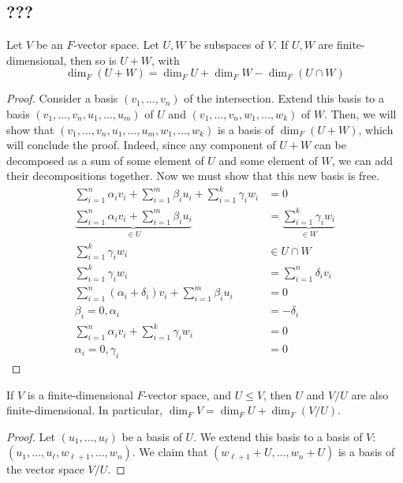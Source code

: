 \subsection{???}
\begin{proposition}
Let \( V \) be an \( F \)-vector space.
Let \( U, W \) be subspaces of \( V \).
If \( U, W \) are finite-dimensional, then so is \( U + W \), with
\[ \dim_F (U + W) = \dim_F U + \dim_F W - \dim_F (U \cap W) \]
\end{proposition}
\begin{proof}
Consider a basis \( (v_1, \dots, v_n) \) of the intersection.
Extend this basis to a basis \( (v_1, \dots, v_n, u_1, \dots, u_m) \) of \( U \) and \( (v_1, \dots, v_n, w_1, \dots, w_k) \) of \( W \).
Then, we will show that \( (v_1, \dots, v_n, u_1, \dots, u_m, w_1, \dots, w_k) \) is a basis of \( \dim_F (U + W) \), which will conclude the proof.
Indeed, since any component of \( U + W \) can be decomposed as a sum of some element of \( U \) and some element of \( W \), we can add their decompositions together.
Now we must show that this new basis is free.
\begin{align*}
    \sum_{i=1}^n \alpha_i v_i + \sum_{i=1}^m \beta_i u_i + \sum_{i=1}^k \gamma_i w_i &= 0 \\
    \underbrace{\sum_{i=1}^n \alpha_i v_i + \sum_{i=1}^m \beta_i u_i}_{\in U} &= \underbrace{\sum_{i=1}^k \gamma_i w_i}_{\in W} \\
    \sum_{i=1}^k \gamma_i w_i &\in U \cap W \\
    \sum_{i=1}^k \gamma_i w_i &= \sum_{i=1}^n \delta_i v_i \\
    \sum_{i=1}^n (\alpha_i + \delta_i) v_i + \sum_{i=1}^m \beta_i u_i &= 0 \\
    \beta_i = 0, \alpha_i &= -\delta_i \\
    \sum_{i=1}^n \alpha_i v_i + \sum_{i=1}^k \gamma_i w_i &= 0 \\
    \alpha_i = 0, \gamma_i &= 0
\end{align*}
\end{proof}
\begin{proposition}
If \( V \) is a finite-dimensional \( F \)-vector space, and \( U \leq V \), then \( U \) and \( V / U \) are also finite-dimensional.
In particular, \( \dim_F V = \dim_F U + \dim_F (V / U) \).
\end{proposition}
\begin{proof}
Let \( (u_1, \dots, u_\ell) \) be a basis of \( U \).
We extend this basis to a basis of \( V \): \( (u_1, \dots, u_\ell, w_{\ell + 1}, \dots, w_n) \).
We claim that \( (w_{\ell + 1} + U, \dots, w_n + U) \) is a basis of the vector space \( V / U \). %
\end{proof}

